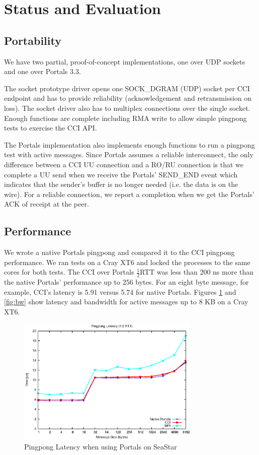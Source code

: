 \section{Status and Evaluation}
\label{sec:evaluation}

\subsection{Portability}
We have two partial, proof-of-concept implementations, one over UDP sockets and
one over Portals 3.3.

The socket prototype driver opens one SOCK\_DGRAM (UDP) socket per CCI endpoint
and has to provide reliability (acknowledgement and retransmission on loss).
The socket driver also has to multiplex connections over the single socket.
Enough functions are complete including RMA write to allow simple pingpong
tests to exercise the CCI API.

The Portals implementation also implements enough functions to run a pingpong
test with active messages. Since Portals assumes a reliable interconnect, the
only difference between a CCI UU connection and a RO/RU connection is that we
complete a UU send when we receive the Portals' SEND\_END event which indicates
that the sender's buffer is no longer needed (i.e. the data is on the wire).
For a reliable connection, we report a completion when we get the Portals' ACK
of receipt at the peer.

\subsection{Performance}
We wrote a native Portals pingpong and compared it to the CCI pingpong
performance. We ran tests on a Cray XT6 and locked the processes to the same
cores for both tests. The CCI over Portals \begin{math}\frac{1}{2}\end{math}RTT
was less than 200 ns more than the native Portals' performance up to 256 bytes.
For an eight byte message, for example, CCI's latency is 5.91 \us versus 5.74
\us for native Portals. Figures \ref{fig:latency} and \ref{fig:bw} show latency
and bandwidth for active messages up to 8 KB on a Cray XT6.

\begin{figure}[htbp]
\centering
\includegraphics[width=3.45in]{pingpong-latency.eps}
\caption{Pingpong Latency when using Portals on SeaStar}
\label{fig:latency}
\end{figure}

